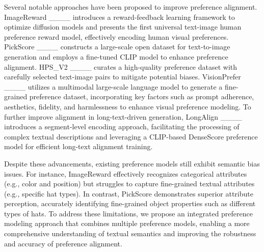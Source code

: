 Several notable approaches have been proposed to improve preference alignment. ImageReward ____ introduces a reward-feedback learning framework to optimize diffusion models and presents the first universal text-image human preference reward model, effectively encoding human visual preferences. PickScore ____ constructs a large-scale open dataset for text-to-image generation and employs a fine-tuned CLIP model to enhance preference alignment. HPS\_V2 ____ curates a high-quality preference dataset with carefully selected text-image pairs to mitigate potential biases. VisionPrefer ____ utilizes a multimodal large-scale language model to generate a fine-grained preference dataset, incorporating key factors such as prompt adherence, aesthetics, fidelity, and harmlessness to enhance visual preference modeling. To further improve alignment in long-text-driven generation, LongAlign ____ introduces a segment-level encoding approach, facilitating the processing of complex textual descriptions and leveraging a CLIP-based DenseScore preference model for efficient long-text alignment training.

Despite these advancements, existing preference models still exhibit semantic bias issues. For instance, ImageReward effectively recognizes categorical attributes (e.g., color and position) but struggles to capture fine-grained textual attributes (e.g., specific hat types). In contrast, PickScore demonstrates superior attribute perception, accurately identifying fine-grained object properties such as different types of hats. To address these limitations, we propose an integrated preference modeling approach that combines multiple preference models, enabling a more comprehensive understanding of textual semantics and improving the robustness and accuracy of preference alignment.